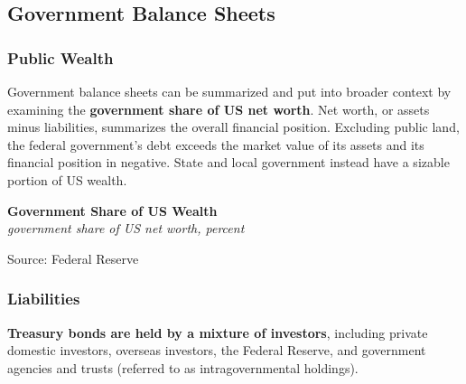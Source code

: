 \documentclass{report}
\makeatletter
\newcommand{\tbllink}[1]{\href{https://raw.githubusercontent.com/bdecon/US-chartbook/master/chartbook/data/#1}{\faTable}}
\newcommand*\short[1]{\expandafter\@gobbletwo\number\numexpr#1\relax}
\newcommand{\absnode}[3]{\node[below right, align=left] at (axis cs: #1,#2) {#3};}
\newcommand{\dateaxisticks}{
		date coordinates in=x, axis line style={draw=none},
		xmax={2022-10-31},
		max space between ticks=40,	    
		xtick={{1990-01-01}, {1992-01-01}, {1994-01-01}, 
			{1996-01-01}, {1998-01-01}, {2000-01-01}, 
			{2002-01-01}, {2004-01-01}, {2006-01-01},
			{2008-01-01}, {2010-01-01}, {2012-01-01}, {2014-01-01},
		    {2016-01-01}, {2018-01-01}, {2020-01-01}, {2022-01-01}, 
		    {2024-01-01}, {2026-01-01}},
		minor xtick={{1989-01-01}, {1991-01-01}, {1993-01-01},
			{1995-01-01}, {1997-01-01}, {1999-01-01}, 
			{2001-01-01}, {2003-01-01}, {2005-01-01}, {2007-01-01},
		    {2009-01-01}, {2011-01-01}, {2013-01-01}, {2015-01-01},
		    {2017-01-01}, {2019-01-01}, {2021-01-01}, {2023-01-01}, 
		    {2025-01-01}, {2027-01-01}},
		enlarge y limits={0.06}, enlarge x limits={0.01},
		}
\newcommand{\bbar}[2]{extra #1 ticks = {{#2}}, extra #1 tick labels = ,
		extra #1 tick style = {grid=major, grid style={thick, black!25}},}
\newcommand{\thickline}[4]{\addplot[ultra thick, no markers, color=#1] 
		table [x=#2, y=#3, col sep=comma] {#4};	}
\newcommand{\rbars}{
		\fill[color=black!10] (axis cs:{1990-07-01},\pgfkeysvalueof{/pgfplots/ymin}) rectangle 
			(axis cs:{1991-03-01}, \pgfkeysvalueof{/pgfplots/ymax});
		\fill[color=black!10] (axis cs:{2007-12-01},\pgfkeysvalueof{/pgfplots/ymin}) rectangle 
			(axis cs:{2009-07-01}, \pgfkeysvalueof{/pgfplots/ymax});
		\fill[color=black!10] (axis cs:{2001-03-01},\pgfkeysvalueof{/pgfplots/ymin}) rectangle 
			(axis cs:{2001-11-01}, \pgfkeysvalueof{/pgfplots/ymax});
		\fill[color=black!10] (axis cs:{2020-02-01},\pgfkeysvalueof{/pgfplots/ymin}) rectangle 
			(axis cs:{2020-05-01}, \pgfkeysvalueof{/pgfplots/ymax});}
\makeatother
\begin{document}
{\begin{minipage}{0.76\textwidth}
\subsection*{Government Balance Sheets}

\subsubsection*{Public Wealth}
\hypertarget{govbs}{}
\small Government balance sheets can be summarized and put into broader context by examining the \textbf{government share of US net worth}. Net worth, or assets minus liabilities, summarizes the overall financial position. Excluding public land, the federal government's debt exceeds the market value of its assets and its financial position in negative. State and local government instead have a sizable portion of US wealth. 


\vspace{2mm}

\normalsize \textbf{Government Share of US Wealth}\\
\footnotesize{\textit{government share of US net worth, percent}}
\vspace{4.2cm}

\hspace{6mm} 

\footnotesize{Source: Federal Reserve} \hfill \tbllink{govshnw.csv}
\end{minipage}
\newpage
\begin{minipage}{0.76\textwidth}
\subsubsection*{Liabilities}
\small \textbf{Treasury bonds are held by a mixture of investors}, including private domestic investors, overseas investors, the Federal Reserve, and government agencies and trusts (referred to as intragovernmental holdings). 


\end{minipage}}
\end{document}
